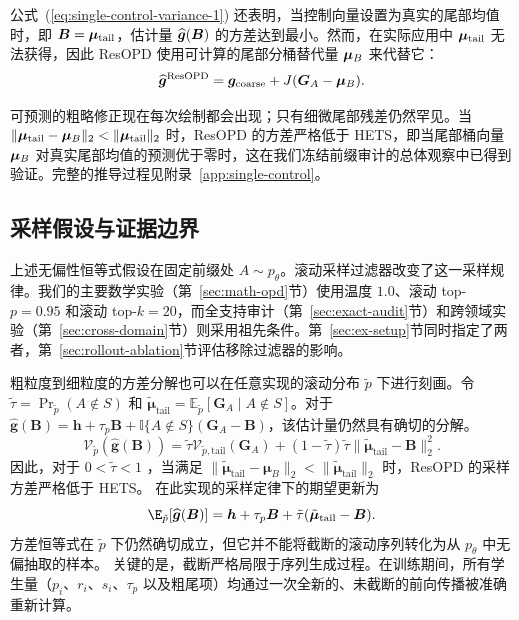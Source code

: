 公式~(\ref{eq:single-control-variance-1}) 还表明，当控制向量设置为真实的尾部均值时，即 $\bm{B} = \bm{\mu}_{\mathrm{tail}}$，估计量 $\widehat{\bm{g}}(\bm{B})$ 的方差达到最小。然而，在实际应用中 $\bm{\mu}_{\mathrm{tail}}$ 无法获得，因此 ResOPD 使用可计算的尾部分桶替代量 $\bm{\mu}_B$ 来代替它：
\begin{equation}
\widehat{\bm{g}}^{\mathrm{ResOPD}}
=\bm{g}_{\mathrm{coarse}}+J(\bm{G}_A-\bm{\mu}_B).
\label{eq:event}
\end{equation}

可预测的粗略修正现在每次绘制都会出现；只有细微尾部残差仍然罕见。当 $\lVert\bm{\mu}_{\mathrm{tail}}-\bm{\mu}_B\rVert_2 < \lVert\bm{\mu}_{\mathrm{tail}}\rVert_2$ 时，ResOPD 的方差严格低于 HETS，即当尾部桶向量 $\bm{\mu}_B$ 对真实尾部均值的预测优于零时，这在我们冻结前缀审计的总体观察中已得到验证。完整的推导过程见附录~\ref{app:single-control}。





\subsection{采样假设与证据边界}
\label{subsec:evidence}

上述无偏性恒等式假设在固定前缀处 $A\sim p_\theta$。滚动采样过滤器改变了这一采样规律。我们的主要数学实验（第~\ref{sec:math-opd}节）使用温度 $1.0$、滚动 top-$p=0.95$ 和滚动 top-$k=20$，而全支持审计（第~\ref{sec:exact-audit}节）和跨领域实验（第~\ref{sec:cross-domain}节）则采用祖先条件。第~\ref{sec:ex-setup}节同时指定了两者，第~\ref{sec:rollout-ablation}节评估移除过滤器的影响。

粗粒度到细粒度的方差分解也可以在任意实现的滚动分布 $\tilde p$ 下进行刻画。令 $\tilde{\tau}=\Pr_{\tilde p}(A\notin S)$ 和 $\tilde{\bm\mu}_{\mathrm{tail}}
=\mathbb{E}_{\tilde p}[\bm G_A\mid A\notin S]$。对于 $\hat{\bm g}(\bm B)=\bm h+\tau_p\bm B+
\mathbb{I}\{A\notin S\}(\bm G_A-\bm B)$，该估计量仍然具有确切的分解。
\begin{equation}
\mathcal V_{\tilde p}(\hat{\bm g}(\bm B))
=
\tilde{\tau}\mathcal V_{\tilde p,\mathrm{tail}}(\bm G_A)
+
(1-\tilde{\tau})\tilde{\tau}
\|\tilde{\bm\mu}_{\mathrm{tail}}-\bm B\|_2^2 .
\label{eq:realized-rollout-variance}
\end{equation}
因此，对于 $0<\tilde{\tau}<1$ ，当满足 $\|\tilde{\bm\mu}_{\mathrm{tail}}-\bm\mu_B\|_2
<\|\tilde{\bm\mu}_{\mathrm{tail}}\|_2$ 时，ResOPD 的采样方差严格低于 HETS。
在此实现的采样定律下的期望更新为
\begin{equation}
 \E_{\tilde p}[\widehat{\bgrad}(\bm B)]
 =\bhead+\tau_p\bm B
  +\tilde\tau(\tilde{\bm\mu}_{\mathrm{tail}}-\bm B).
 \label{eq:realized-rollout-mean}
\end{equation}
方差恒等式在 $\tilde p$ 下仍然确切成立，但它并不能将截断的滚动序列转化为从 $p_\theta$ 中无偏抽取的样本。  
关键的是，截断严格局限于序列生成过程。在训练期间，所有学生量（$p_i$、$r_i$、$s_i$、$\tau_p$ 以及粗尾项）均通过一次全新的、未截断的前向传播被准确重新计算。

